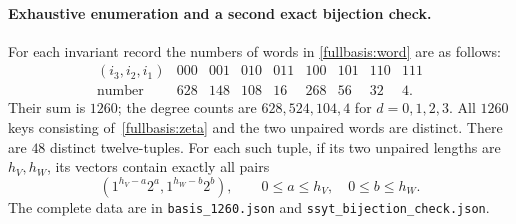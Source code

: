 \paragraph{Exhaustive enumeration and a second exact bijection check.}
For each invariant record the numbers of words in
\eqref{fullbasis:word} are as follows:
\[
\begin{array}{c|rrrrrrrr}
(i_3,i_2,i_1)&000&001&010&011&100&101&110&111\\\hline
\text{number}&628&148&108&16&268&56&32&4.
\end{array}
\]
Their sum is $1260$; the degree counts are $628,524,104,4$ for
$d=0,1,2,3$.  All $1260$ keys consisting of~\eqref{fullbasis:zeta}
and the two unpaired words are distinct.  There are $48$ distinct
twelve-tuples.  For each such tuple, if its two unpaired lengths are
$h_V,h_W$, its vectors contain exactly all pairs
\[
 (1^{h_V-a}2^a,1^{h_W-b}2^b),\qquad
 0\leq a\leq h_V,\quad0\leq b\leq h_W.
\]
The complete data are in \texttt{basis\_1260.json} and
\texttt{ssyt\_bijection\_check.json}.

